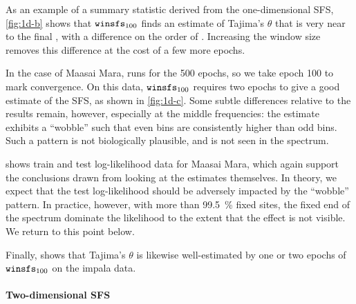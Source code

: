 As an example of a summary statistic derived from the one-dimensional SFS, \cref{fig:1d-b} shows that $\winsfs[100]$ finds an estimate of Tajima's $\theta$ that is very near to the final \realsfs, with a difference on the order of .
Increasing the window size removes this difference at the cost of a few more epochs.

In the case of Maasai Mara, \realsfs runs for the \num{500} epochs, so we take epoch \num{100} to mark convergence.
On this data, $\winsfs[100]$ requires two epochs to give a good estimate of the SFS, as shown in \cref{fig:1d-c}.
Some subtle differences relative to the \realsfs results remain, however, especially at the middle frequencies:
the \realsfs estimate exhibits a \enquote{wobble} such that even bins are consistently higher than odd bins.
Such a pattern is not biologically plausible, and is not seen in the \winsfs spectrum.

 shows train and test log-likelihood data for Maasai Mara, which again support the conclusions drawn from looking at the estimates themselves.
In theory, we expect that the test log-likelihood should be adversely impacted by the \realsfs \enquote{wobble} pattern.
In practice, however, with more than \SI{99.5}{\percent} fixed sites, the fixed end of the spectrum dominate the likelihood to the extent that the effect is not visible.
We return to this point below.

Finally,  shows that Tajima's $\theta$ is likewise well-estimated by one or two epochs of $\winsfs[100]$ on the impala data.

\paragraph{Two-dimensional SFS}

